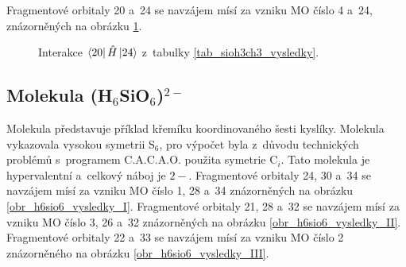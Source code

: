 \documentclass[
  printed, %
  table,   %
  lof,     %
  lot,     %
  oneside,
]{fithesis3}
\begin{document}
Fragmentové orbitaly  20 a~24 se navzájem mísí za vzniku MO číslo 4 a~24, znázorněných na obrázku \ref{obr_sioh3ch3_vysledky_IV}.   
\begin{figure}
\begin{center}
\caption{Interakce $\bra{20}{\hat{H}}\ket{24}$  z~tabulky \ref{tab_sioh3ch3_vysledky}.}

\label{obr_sioh3ch3_vysledky_IV}\end{center}
\end{figure} 
  \subsection{Molekula (H$_6$SiO$_6$)$^{2-}$}
  Molekula  představuje příklad křemíku koordinovaného šesti kyslíky. Molekula vykazovala vysokou symetrii S$_6$, pro výpočet byla z~důvodu technických problémů s~programem C.A.C.A.O. použita symetrie C$_i$. Tato molekula je hypervalentní a~celkový náboj je $2-$. Fragmentové orbitaly  24, 30 a~34 se navzájem mísí za vzniku MO číslo 1, 28 a~34 znázorněných na obrázku \ref{obr_h6sio6_vysledky_I}. Fragmentové orbitaly  21, 28 a~32 se navzájem mísí za vzniku MO číslo 3, 26 a~32 znázorněných na obrázku \ref{obr_h6sio6_vysledky_II}. Fragmentové orbitaly  22 a~33 se navzájem mísí za vzniku MO číslo 2 znázorněného na obrázku \ref{obr_h6sio6_vysledky_III}. 
  
\end{document}
